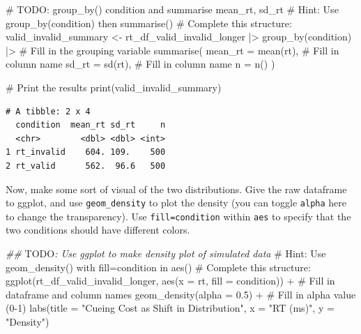 \documentclass[
  letterpaper,
  DIV=11,
  numbers=noendperiod]{scrartcl}
\newenvironment{Shaded}{\begin{snugshade}}{\end{snugshade}}
\newcommand{\AlertTok}[1]{\textcolor[rgb]{0.68,0.00,0.00}{#1}}
\newcommand{\AttributeTok}[1]{\textcolor[rgb]{0.40,0.45,0.13}{#1}}
\newcommand{\CommentTok}[1]{\textcolor[rgb]{0.37,0.37,0.37}{#1}}
\newcommand{\DocumentationTok}[1]{\textcolor[rgb]{0.37,0.37,0.37}{\textit{#1}}}
\newcommand{\FloatTok}[1]{\textcolor[rgb]{0.68,0.00,0.00}{#1}}
\newcommand{\FunctionTok}[1]{\textcolor[rgb]{0.28,0.35,0.67}{#1}}
\newcommand{\NormalTok}[1]{\textcolor[rgb]{0.00,0.23,0.31}{#1}}
\newcommand{\OtherTok}[1]{\textcolor[rgb]{0.00,0.23,0.31}{#1}}
\newcommand{\SpecialCharTok}[1]{\textcolor[rgb]{0.37,0.37,0.37}{#1}}
\newcommand{\StringTok}[1]{\textcolor[rgb]{0.13,0.47,0.30}{#1}}
\begin{document}
\begin{Shaded}
\begin{Highlighting}[]
\CommentTok{\# }\AlertTok{TODO}\CommentTok{: group\_by() condition and summarise mean\_rt, sd\_rt}
\CommentTok{\# Hint: Use group\_by(condition) then summarise()}
\CommentTok{\# Complete this structure:}
\NormalTok{valid\_invalid\_summary }\OtherTok{\textless{}{-}}\NormalTok{ rt\_df\_valid\_invalid\_longer }\SpecialCharTok{|\textgreater{}}
  \FunctionTok{group\_by}\NormalTok{(condition) }\SpecialCharTok{|\textgreater{}}  \CommentTok{\# Fill in the grouping variable}
  \FunctionTok{summarise}\NormalTok{(}
    \AttributeTok{mean\_rt =} \FunctionTok{mean}\NormalTok{(rt),  }\CommentTok{\# Fill in column name}
    \AttributeTok{sd\_rt =} \FunctionTok{sd}\NormalTok{(rt),      }\CommentTok{\# Fill in column name}
    \AttributeTok{n =} \FunctionTok{n}\NormalTok{()}
\NormalTok{  )}

\CommentTok{\# Print the results}
\FunctionTok{print}\NormalTok{(valid\_invalid\_summary)}
\end{Highlighting}
\end{Shaded}

\begin{verbatim}
# A tibble: 2 x 4
  condition  mean_rt sd_rt     n
  <chr>        <dbl> <dbl> <int>
1 rt_invalid    604. 109.    500
2 rt_valid      562.  96.6   500
\end{verbatim}

Now, make some sort of visual of the two distributions. Give the raw
dataframe to ggplot, and use \texttt{geom\_density} to plot the density
(you can toggle \texttt{alpha} here to change the transparency). Use
\texttt{fill=condition} within \texttt{aes} to specify that the two
conditions should have different colors.

\begin{Shaded}
\begin{Highlighting}[]
\DocumentationTok{\#\# }\AlertTok{TODO}\DocumentationTok{: Use ggplot to make density plot of simulated data}
\CommentTok{\# Hint: Use geom\_density() with fill=condition in aes()}
\CommentTok{\# Complete this structure:}
\FunctionTok{ggplot}\NormalTok{(rt\_df\_valid\_invalid\_longer, }\FunctionTok{aes}\NormalTok{(}\AttributeTok{x =}\NormalTok{ rt, }\AttributeTok{fill =}\NormalTok{ condition)) }\SpecialCharTok{+}  \CommentTok{\# Fill in dataframe and column names}
  \FunctionTok{geom\_density}\NormalTok{(}\AttributeTok{alpha =} \FloatTok{0.5}\NormalTok{) }\SpecialCharTok{+}            \CommentTok{\# Fill in alpha value (0{-}1)}
  \FunctionTok{labs}\NormalTok{(}\AttributeTok{title =} \StringTok{"Cueing Cost as Shift in Distribution"}\NormalTok{, }\AttributeTok{x =} \StringTok{"RT (ms)"}\NormalTok{, }\AttributeTok{y =} \StringTok{"Density"}\NormalTok{)}
\end{Highlighting}
\end{Shaded}
\end{document}
